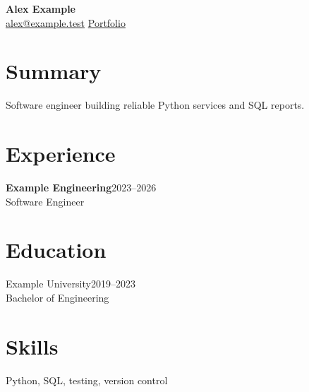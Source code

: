 \documentclass[10pt]{article}
\begin{document}
\begin{center}
{\Large\bfseries Alex Example}\\
\href{mailto:alex@example.test}{alex@example.test}\quad
\href{https://example.test/portfolio}{Portfolio}
\end{center}
\section*{Summary}
Software engineer building reliable Python services and SQL reports.
\section*{Experience}
\textbf{Example Engineering}\hfill 2023--2026\\
Software Engineer

\section*{Education}
Example University\hfill 2019--2023\\
Bachelor of Engineering
\section*{Skills}
Python, SQL, testing, version control
\end{document}
